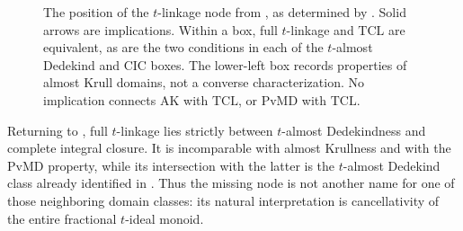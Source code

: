 \documentclass[11pt]{amsart}
\theoremstyle{definition}
\theoremstyle{remark}
\newcommand{\PvMD}{\mathrm{PvMD}}
\newcommand{\TCL}{\mathrm{TCL}}
\newcommand{\CIC}{\mathrm{CIC}}
\newcommand{\AK}{\mathrm{AK}}
\begin{document}
\begin{figure}[ht]
\centering
{}
\caption{The position of the $t$-linkage node from
\cite[Figure~1]{KabbajMimouniStar}, as determined by .
Solid arrows are implications.  Within a box, full $t$-linkage
and $\TCL$ are equivalent, as are the two conditions in each of the
$t$-almost Dedekind and $\CIC$ boxes.  The lower-left box records properties of almost Krull domains, not a
converse characterization.  No implication connects $\AK$ with $\TCL$,
or $\PvMD$ with $\TCL$.}
\label{fig:placement}
\end{figure}
\FloatBarrier

Returning to , full $t$-linkage lies strictly between
$t$-almost Dedekindness and complete integral closure.  It is incomparable
with almost Krullness and with the $\PvMD$ property, while its intersection
with the latter is the $t$-almost Dedekind class already identified in
\cite[Corollary~3.4]{KabbajMimouniStar}.  Thus the missing node is not
another name for one of those neighboring domain classes: its natural
interpretation is cancellativity of the entire fractional $t$-ideal monoid.
\end{document}
